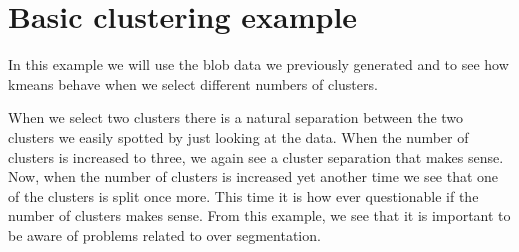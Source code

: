 \documentclass[letterpaper,10pt,english]{sphinxmanual}
\begin{document}
\section{Basic clustering example}
\label{\detokenize{ML4NeutronImageSegmentation:basic-clustering-example}}
In this example we will use the blob data we previously generated and to see how k\sphinxhyphen{}means behave when we select different numbers of clusters.

\begin{sphinxVerbatim}[commandchars=\\\{\}]
   

    
          
    \PYG{p}{[}\PYG{p}{]}  
    \PYG{p}{[}\PYG{p}{]}
\end{sphinxVerbatim}

\noindent{}

When we select two clusters there is a natural separation between the two clusters we easily spotted by just looking at the data. When the number of clusters is increased to three, we again see a cluster separation that makes sense. Now, when the number of clusters is increased yet another time we see that one of the clusters is split once more. This time it is how ever questionable if the number of clusters makes sense. From this example, we see that it is important to be aware of problems related to over segmentation.
\end{document}
